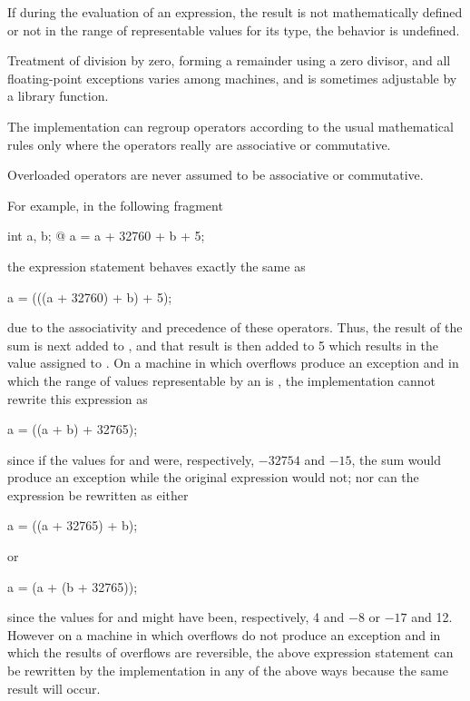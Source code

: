 \pnum
{}%
%
%
%
%
If during the evaluation of an expression, the result is not
mathematically defined or not in the range of representable values for
its type, the behavior is undefined.
\begin{note}
%
Treatment of division by zero, forming a remainder using a zero divisor,
and all floating-point exceptions varies among machines, and is sometimes
adjustable by a library function.
\end{note}

\pnum
{}%
%
\begin{note}
The implementation can regroup operators according to
the usual mathematical rules only
where the operators really are associative or commutative.
\begin{footnote}
Overloaded
operators are never assumed to be associative or commutative.
\end{footnote}
For example, in the following fragment
\begin{codeblock}
int a, b;
@\commentellip@
a = a + 32760 + b + 5;
\end{codeblock}
the expression statement behaves exactly the same as
\begin{codeblock}
a = (((a + 32760) + b) + 5);
\end{codeblock}
due to the associativity and precedence of these operators. Thus, the
result of the sum  is next added to , and
that result is then added to 5 which results in the value assigned to
. On a machine in which overflows produce an exception and in
which the range of values representable by an  is
, the implementation cannot rewrite this
expression as
\begin{codeblock}
a = ((a + b) + 32765);
\end{codeblock}
since if the values for  and  were, respectively,
$-32754$ and $-15$, the sum  would produce an exception while
the original expression would not; nor can the expression be rewritten
as either
\begin{codeblock}
a = ((a + 32765) + b);
\end{codeblock}
or
\begin{codeblock}
a = (a + (b + 32765));
\end{codeblock}
since the values for  and  might have been,
respectively, 4 and $-8$ or $-17$ and 12. However on a machine in which
overflows do not produce an exception and in which the results of
overflows are reversible, the above expression statement can be
rewritten by the implementation in any of the above ways because the
same result will occur.
\end{note}

